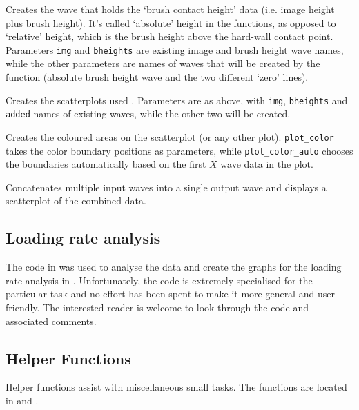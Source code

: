 \documentclass[12pt,a4paper]{article}
\begin{document}
\begin{description}[style=nextline]

\item[absrelheights]
Creates the wave that holds the \enquote*{brush contact height} data (i.e. image height plus brush height). It's called \enquote*{absolute} height in the functions, as opposed to \enquote*{relative} height, which is the brush height above the hard-wall contact point.
Parameters \texttt{img} and \texttt{bheights} are existing image and brush height wave names, while the other parameters are names of waves that will be created by the function (absolute brush height wave and the two different \enquote*{zero} lines).

\item[scatterplots]
Creates the scatterplots used \cite[p.~57]{hyotyla2016}. Parameters are as above, with \texttt{img}, \texttt{bheights} and \texttt{added} names of existing waves, while the other two will be created.

\item[plot\_color, plot\_color\_auto]
Creates the coloured areas on the scatterplot (or any other plot). \texttt{plot\_color} takes the color boundary positions as parameters, while \texttt{plot\_color\_auto} chooses the boundaries automatically based on the first $X$ wave data in the plot.

\item[absrelheights\_combine]
Concatenates multiple input waves into a single output wave and displays a scatterplot of the combined data.

\end{description}

\subsection{Loading rate analysis}
The code in  was used to analyse the data and create the graphs for the loading rate analysis in \cite[p.~66]{hyotyla2016}. Unfortunately, the code is extremely specialised for the particular task and no effort has been spent to make it more general and user-friendly.
The interested reader is welcome to look through the code and associated comments.


\subsection{Helper Functions}
Helper functions assist with miscellaneous small tasks. The functions are located in  and .
\end{document}
